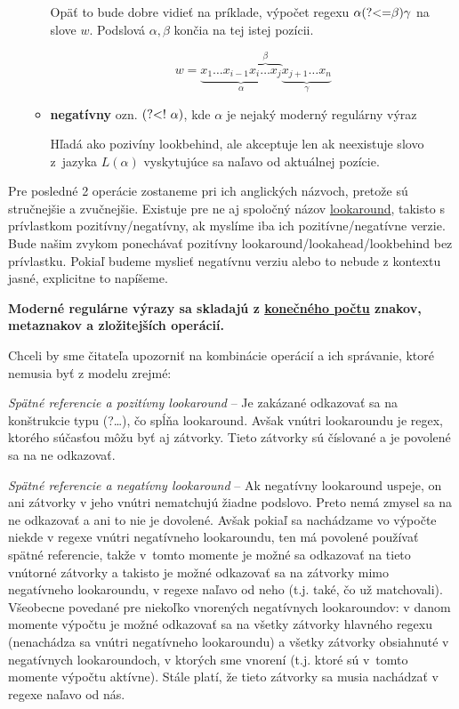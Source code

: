 \begin{itemize}
\begin{itemize}
Opäť to bude dobre vidieť na príklade, výpočet regexu $\alpha\text{(?\textless =}\beta)\gamma$ na slove $w$. Podslová $\alpha,\beta$ končia na tej istej pozícii.

$$w = \underbrace{x_1\dots x_{i-1} \overbrace{x_i \dots x_j}^\beta}_\alpha \underbrace{x_{j+1} \dots x_n }_\gamma$$
\item \textbf{negatívny} ozn. $\text{(?\textless !~}\alpha)$, kde $\alpha$ je nejaký moderný regulárny výraz 

Hľadá ako pozivíny lookbehind, ale akceptuje len ak neexistuje slovo z~jazyka $L(\alpha)$ vyskytujúce sa naľavo od aktuálnej pozície.
\end{itemize}
\end{itemize}

Pre posledné 2 operácie zostaneme pri ich anglických názvoch, pretože sú stručnejšie a zvučnejšie. Existuje pre ne aj spoločný názov \underline{lookaround}, takisto s prívlastkom pozitívny/negatívny, ak myslíme iba ich pozitívne/negatívne verzie. Bude našim zvykom ponechávať pozitívny lookaround/lookahead/lookbehind bez prívlastku. Pokiaľ budeme myslieť negatívnu verziu alebo to nebude z kontextu jasné, explicitne to napíšeme.
\\ \par
\textbf{Moderné regulárne výrazy sa skladajú z \underline{konečného počtu} znakov, metaznakov a zložitejších operácií.}
\\ \par
Chceli by sme čitateľa upozorniť na kombinácie operácií a ich správanie, ktoré nemusia byť z modelu zrejmé:

\textit{Spätné referencie a pozitívny lookaround} -- Je zakázané odkazovať sa na konštrukcie typu (?\dots), čo spĺňa lookaround. Avšak vnútri lookaroundu je regex, ktorého súčasťou môžu byť aj zátvorky. Tieto zátvorky sú číslované a je povolené sa na ne odkazovať.

\textit{Spätné referencie a negatívny lookaround} -- Ak negatívny lookaround uspeje, on ani zátvorky v jeho vnútri nematchujú žiadne podslovo. Preto nemá zmysel sa na ne odkazovať a ani to nie je dovolené. Avšak pokiaľ sa nachádzame vo výpočte niekde v regexe vnútri negatívneho lookaroundu, ten má povolené používať spätné referencie, takže v~tomto momente je možné sa odkazovať na tieto vnútorné zátvorky a takisto je možné odkazovať sa na zátvorky mimo negatívneho lookaroundu, v regexe naľavo od neho (t.j. také, čo už matchovali). Všeobecne povedané pre niekoľko vnorených negatívnych lookaroundov: v danom momente výpočtu je možné odkazovať sa na všetky zátvorky hlavného regexu (nenachádza sa vnútri negatívneho lookaroundu) a všetky zátvorky obsiahnuté v negatívnych lookaroundoch, v ktorých sme vnorení (t.j. ktoré sú v~tomto momente výpočtu aktívne). Stále platí, že tieto zátvorky sa musia nachádzať v regexe naľavo od nás.

